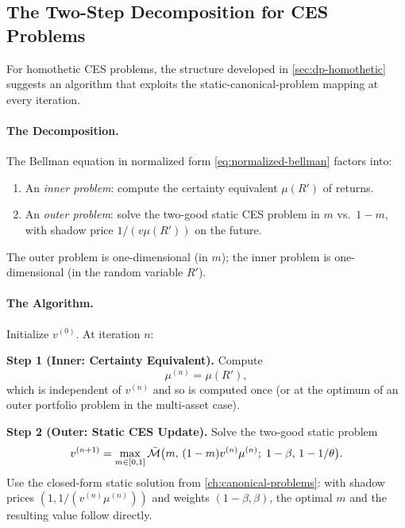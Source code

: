 \subsection{The Two-Step Decomposition for CES Problems}
\label{subsec:dp-two-step}

For homothetic CES problems, the structure developed in \cref{sec:dp-homothetic} suggests an algorithm that exploits the static-canonical-problem mapping at every iteration.

\paragraph{The Decomposition.}
The Bellman equation in normalized form \cref{eq:normalized-bellman} factors into:
\begin{enumerate}[leftmargin=2em]
    \item An \emph{inner problem}: compute the certainty equivalent $\mu(R')$ of returns.
    \item An \emph{outer problem}: solve the two-good static CES problem in $m$ vs.\ $1-m$, with shadow price $1/(v \mu(R'))$ on the future.
\end{enumerate}
The outer problem is one-dimensional (in $m$); the inner problem is one-dimensional (in the random variable $R'$).

\paragraph{The Algorithm.}
Initialize $v^{(0)}$. At iteration $n$:

\textbf{Step 1 (Inner: Certainty Equivalent).} Compute
\begin{equation}
\mu^{(n)} = \mu(R'),
\label{eq:inner-CE}
\end{equation}
which is independent of $v^{(n)}$ and so is computed once (or at the optimum of an outer portfolio problem in the multi-asset case).

\textbf{Step 2 (Outer: Static CES Update).} Solve the two-good static problem
\begin{equation}
v^{(n+1)} = \max_{m \in [0,1]} \bar{\mathcal{M}}\big( m, \, (1-m) v^{(n)} \mu^{(n)}; \; 1-\beta, \, 1-1/\theta \big).
\label{eq:outer-CES}
\end{equation}
Use the closed-form static solution from \cref{ch:canonical-problems}: with shadow prices $(1, 1/(v^{(n)} \mu^{(n)}))$ and weights $(1-\beta, \beta)$, the optimal $m$ and the resulting value follow directly.

